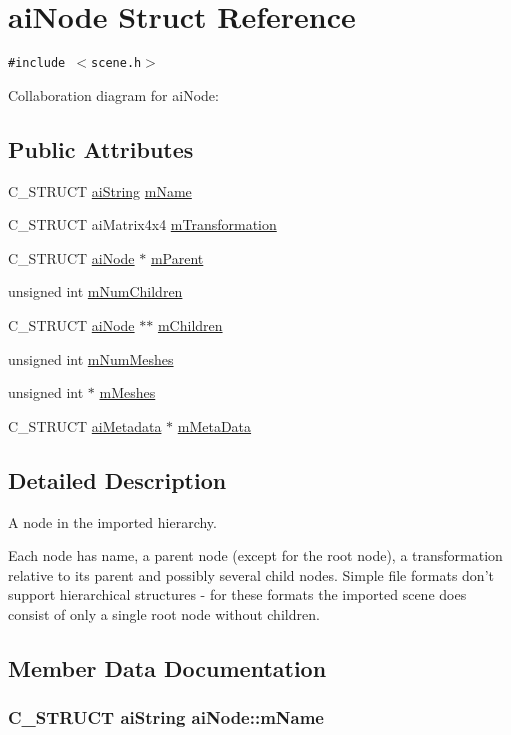 \hypertarget{structai_node}{
\section{aiNode Struct Reference}
\label{structai_node}
}
{\tt \#include $<$scene.h$>$}

Collaboration diagram for aiNode:\subsection*{Public Attributes}
\begin{CompactItemize}
\item 
C\_\-STRUCT \hyperlink{structai_string}{aiString} \hyperlink{structai_node_fa528a7e43e15d92a920229b1ff094f6}{mName}
\item 
C\_\-STRUCT aiMatrix4x4 \hyperlink{structai_node_adb69c766c7658bba9d2195af16d6831}{mTransformation}
\item 
C\_\-STRUCT \hyperlink{structai_node}{aiNode} $\ast$ \hyperlink{structai_node_a6896b42c78e784db85d822a4c8dd404}{mParent}
\item 
unsigned int \hyperlink{structai_node_f5030494b156ec54632e6182a6e386ca}{mNumChildren}
\item 
C\_\-STRUCT \hyperlink{structai_node}{aiNode} $\ast$$\ast$ \hyperlink{structai_node_c700679f0d4971f124e8444f68057291}{mChildren}
\item 
unsigned int \hyperlink{structai_node_7a411079096f86d1e96b6368d237d897}{mNumMeshes}
\item 
unsigned int $\ast$ \hyperlink{structai_node_cd1706d6508b31916c18e39b7085ca63}{mMeshes}
\item 
C\_\-STRUCT \hyperlink{structai_metadata}{aiMetadata} $\ast$ \hyperlink{structai_node_111b5a6cbc5dccde0cf2a17a6e5c3b67}{mMetaData}
\end{CompactItemize}


\subsection{Detailed Description}
A node in the imported hierarchy.

Each node has name, a parent node (except for the root node), a transformation relative to its parent and possibly several child nodes. Simple file formats don't support hierarchical structures - for these formats the imported scene does consist of only a single root node without children. 

\subsection{Member Data Documentation}
\hypertarget{structai_node_fa528a7e43e15d92a920229b1ff094f6}{
\subsubsection[mName]{\setlength{\rightskip}{0pt plus 5cm}C\_\-STRUCT {\bf aiString} {\bf aiNode::mName}}}
\label{structai_node_fa528a7e43e15d92a920229b1ff094f6}


